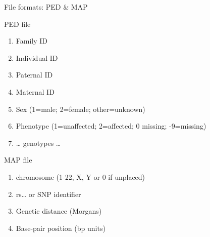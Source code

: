 \begin{frame}{File formats: PED \& MAP}

\begin{block}{PED file}

\begin{enumerate}
\def\labelenumi{\arabic{enumi}.}
\itemsep1pt\parskip0pt
\item
  Family ID
\item
  Individual ID
\item
  Paternal ID
\item
  Maternal ID
\item
  Sex (1=male; 2=female; other=unknown)
\item
  Phenotype (1=unaffected; 2=affected; 0 missing; -9=missing)
\item
  \ldots{} genotypes \ldots{}
\end{enumerate}

\end{block}

\begin{block}{MAP file}

\begin{enumerate}
\def\labelenumi{\arabic{enumi}.}
\itemsep1pt\parskip0pt
\item
  chromosome (1-22, X, Y or 0 if unplaced)
\item
  rs\ldots{} or SNP identifier
\item
  Genetic distance (Morgans)
\item
  Base-pair position (bp units)
\end{enumerate}

\end{block}

\end{frame}
